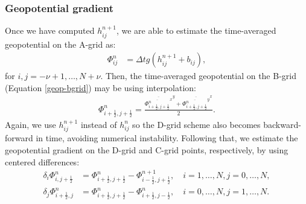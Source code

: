 \subsubsection{Geopotential gradient}
Once we have computed $h^{n+1}_{ij}$, we are able to estimate the time-averaged geopotential on the A-grid as:
\begin{align}
	\label{2d-sw-eq-Dgrid-geo}
	\Phi^n_{ij} &= \Delta t{g(h^{n+1}_{ij} + b_{ij})},
\end{align}
for $i,j=-\nu+1, \ldots, N+\nu$.
Then, the  time-averaged geopotential on the B-grid (Equation \eqref{geop-bgrid}) may be using interpolation:
\begin{align}
	\Phi^n_{i+\frac{1}{2},j+\frac{1}{2}} = 
	\frac{\overline{\overline{\Phi^n_{i+\frac{1}{2},j+\frac{1}{2}}}^x}^y +  \overline{\overline{\Phi^n_{i+\frac{1}{2},j+\frac{1}{2}}}^y}^x}{2}.
\end{align}
Again, we use $h^{n+1}_{ij}$ instead of $h^{n}_{ij}$ so the D-grid scheme also becomes backward-forward in time, avoiding numerical instability.
Following that, we estimate the geopotential gradient on the D-grid and C-grid points, respectively, by using centered differences:
\begin{align}
	\label{2d-sw-eq-Dgrid-geo-dx}
	\delta_i \Phi^n_{i,j+\frac{1}{2}} &= 
	\Phi^{n}_{i+\frac{1}{2},j+\frac{1}{2}} - \Phi^{n+1}_{i-\frac{1}{2},j+\frac{1}{2}},
	\quad i=1,\ldots,N, j=0,\ldots,N,\\
	\label{2d-sw-eq-Dgrid-geo-dy}
	\delta_j \Phi^n_{i+\frac{1}{2},j} &=
	\Phi^{n}_{i+\frac{1}{2},j+\frac{1}{2}} - \Phi^{n}_{i+\frac{1}{2},j-\frac{1}{2}},
	\quad i=0,\ldots,N, j=1,\ldots,N.
\end{align}

